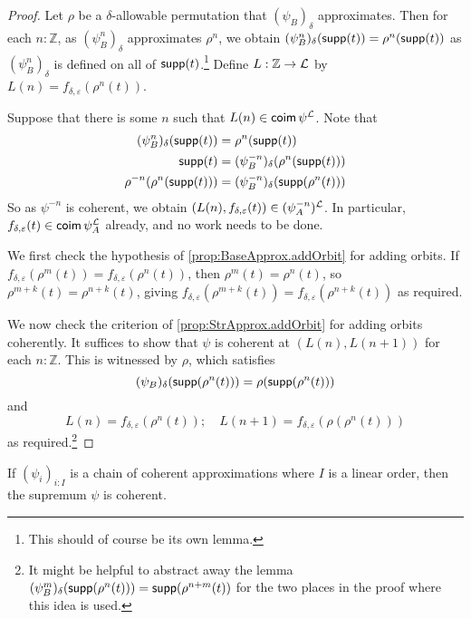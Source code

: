 \begin{proof}
  Let \( \rho \) be a \( \delta \)-allowable permutation that \( (\psi_B)_\delta \) approximates.
  Then for each \( n : \mathbb Z \), as \( (\psi^n_B)_\delta \) approximates \( \rho^n \), we obtain \( (\psi^n_B)_\delta(\operatorname{\mathsf{supp}}(t)) = \rho^n(\operatorname{\mathsf{supp}}(t)) \) as \( (\psi^n_B)_\delta \) is defined on all of \( \operatorname{\mathsf{supp}}(t) \).\footnote{This should of course be its own lemma.}
  Define \( L : \mathbb Z \to {\mathcal L} \) by \( L(n) = f_{\delta,\varepsilon}(\rho^n(t)) \).

  Suppose that there is some \( n \) such that \( L(n) \in \operatorname{\mathsf{coim}} \psi^{\mathcal L} \).
  Note that
  \begin{align*}
    (\psi^n_B)_\delta(\operatorname{\mathsf{supp}}(t)) &= \rho^n(\operatorname{\mathsf{supp}}(t)) \\
    \operatorname{\mathsf{supp}}(t) &= (\psi^{-n}_B)_\delta(\rho^n(\operatorname{\mathsf{supp}}(t))) \\
    \rho^{-n}(\rho^n(\operatorname{\mathsf{supp}}(t))) &= (\psi^{-n}_B)_\delta(\operatorname{\mathsf{supp}}(\rho^n(t)))
  \end{align*}
  So as \( \psi^{-n} \) is coherent, we obtain \( (L(n), f_{\delta,\varepsilon}(t)) \in (\psi^{-n}_A)^{\mathcal L} \).
  In particular, \( f_{\delta,\varepsilon}(t) \in \operatorname{\mathsf{coim}} \psi_A^{\mathcal L} \) already, and no work needs to be done.

  We first check the hypothesis of \cref{prop:BaseApprox.addOrbit} for adding orbits.
  If \( f_{\delta,\varepsilon}(\rho^m(t)) = f_{\delta,\varepsilon}(\rho^n(t)) \), then \( \rho^m(t) = \rho^n(t) \), so \( \rho^{m+k}(t) = \rho^{n+k}(t) \), giving \( f_{\delta,\varepsilon}(\rho^{m+k}(t)) = f_{\delta,\varepsilon}(\rho^{n+k}(t)) \) as required.

  We now check the criterion of \cref{prop:StrApprox.addOrbit} for adding orbits coherently.
  It suffices to show that \( \psi \) is coherent at \( (L(n), L(n+1)) \) for each \( n : \mathbb Z \).
  This is witnessed by \( \rho \), which satisfies
  \[ (\psi_B)_\delta(\operatorname{\mathsf{supp}}(\rho^n(t))) = \rho(\operatorname{\mathsf{supp}}(\rho^n(t))) \]
  and
  \[ L(n) = f_{\delta,\varepsilon}(\rho^n(t));\quad L(n+1) = f_{\delta,\varepsilon}(\rho(\rho^n(t))) \]
  as required.\footnote{It might be helpful to abstract away the lemma \( (\psi^m_B)_\delta(\operatorname{\mathsf{supp}}(\rho^n(t))) = \operatorname{\mathsf{supp}}(\rho^{n+m}(t)) \) for the two places in the proof where this idea is used.}
\end{proof}
\begin{proposition}
  \label{prop:StrApprox.chain}
  If \( (\psi_i)_{i : I} \) is a chain of coherent approximations where \( I \) is a linear order, then the supremum \( \psi \) is coherent.
\end{proposition}
